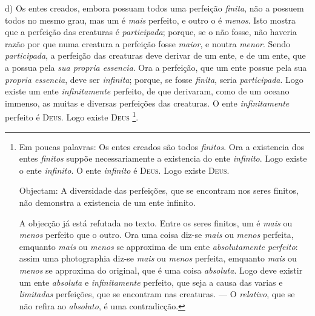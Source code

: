  d) Os entes creados, embora possuam todos uma perfeição \emph{finita}, não a possuem todos no mesmo grau, mas um é \emph{mais} perfeito, e outro o é \emph{menos}. Isto mostra que a perfeição das creaturas é \emph{participada}; porque, se o não fosse, não haveria razão por que numa creatura a perfeição fosse \emph{maior}, e noutra \emph{menor}. Sendo \emph{participada}, a perfeição das creaturas deve derivar de um ente, e de um ente, que a possua pela \emph{sua propria essencia}. Ora a perfeição, que um ente possue pela sua \emph{propria essencia}, deve ser \emph{infinita}; porque, se fosse \emph{finita}, seria \emph{participada}. Logo existe um ente \emph{infinitamente} perfeito, de que derivaram, como de um oceano immenso, as muitas e diversas perfeições das creaturas. O ente \emph{infinitamente} perfeito é \textsc{Deus}. Logo existe \textsc{Deus} \footnote{Em poucas palavras: Os entes creados são todos \emph{finitos}. Ora a existencia dos entes \emph{finitos} suppõe necessariamente a existencia do ente \emph{infinito}. Logo existe o ente \emph{infinito}. O ente \emph{infinito} é \textsc{Deus}. Logo existe \textsc{Deus}.\par Objectam: A diversidade das perfeições, que se encontram nos seres finitos, não demonstra a existencia de um ente infinito.\par A objecção já está refutada no texto. Entre os seres finitos, um é \emph{mais} ou \emph{menos} perfeito que o outro. Ora uma coisa diz-se \emph{mais} ou \emph{menos} perfeita, emquanto \emph{mais} ou \emph{menos} se approxima de um ente \emph{absolutamente perfeito}: assim uma photographia diz-se \emph{mais} ou \emph{menos} perfeita, emquanto \emph{mais} ou \emph{menos} se approxima do original, que é uma coisa \emph{absoluta}. Logo deve existir um ente \emph{absoluta} e \emph{infinitamente} perfeito, que seja a causa das varias e \emph{limitadas} perfeições, que se encontram nas creaturas. --- O \emph{relativo}, que se não refira ao \emph{absoluto}, é uma contradicção.}.

